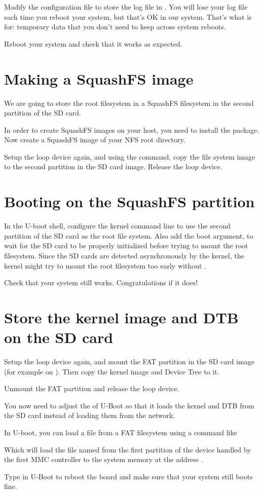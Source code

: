 Modify the  configuration file to store
the log file in . You will lose your log
file each time you reboot your system, but that's OK in our
system. That's what  is for: temporary data that you don't need
to keep across system reboots.

Reboot your system and check that it works as expected.

\section{Making a SquashFS image}

We are going to store the root filesystem in a SquashFS filesystem in
the second partition of the SD card.

In order to create SquashFS images on your host, you need to install
the  package. Now create a SquashFS image of your
NFS root directory.

Setup the loop device again, and using the  command,
copy the file system image to the second partition in the SD card
image. Release the loop device.

\section{Booting on the SquashFS partition}

In the U-boot shell, configure the kernel command line to use the
second partition of the SD card as the root file system. Also add the
 boot argument, to wait for the SD card to be properly
initialized before trying to mount the root filesystem. Since the SD
cards are detected asynchronously by the kernel, the kernel might try
to mount the root filesystem too early without .

Check that your system still works. Congratulations if it does!

\section{Store the kernel image and DTB on the SD card}

Setup the loop device again, and mount the FAT partition
in the SD card image (for example on ).
Then copy the kernel image and Device Tree to it.

Unmount the FAT partition and release the loop device.

You now need to adjust the  of U-Boot so
that it loads the kernel and DTB from the SD card instead of loading
them from the network.

In U-boot, you can load a file from a FAT filesystem using a command
like


Which will load the file named  from the first
partition of the device handled by the first MMC controller to the
system memory at the address .

Type  in U-Boot to reboot the board and make
sure that your system still boots fine.
